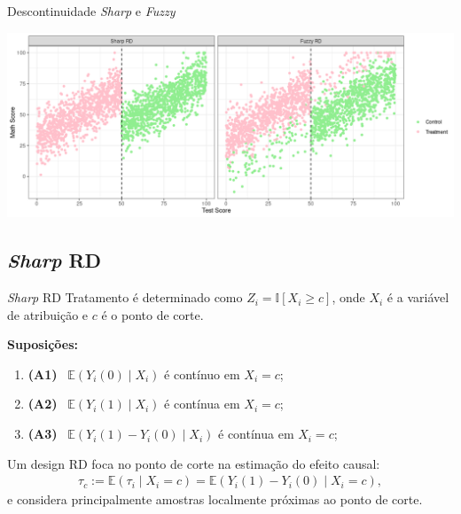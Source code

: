\documentclass[aspectratio=1610, 10pt]{beamer}
\begin{document}
\begin{frame}{Descontinuidade \emph{Sharp} e \emph{Fuzzy}}
    \begin{center}
        \includegraphics[width = \linewidth]{fig/FuzzySharpSimulation.png}
    \end{center}
\end{frame}


\subsection{\textit{Sharp} RD}

\begin{frame}{\textit{Sharp} RD}
    Tratamento é determinado como $Z_i = \mathbb{I}[X_i \geq c]$, onde $X_i$ é a variável de atribuição e $c$ é o ponto de corte.

    \vspace{0.3cm}
    \textbf{Suposições:}
    \begin{enumerate}
        \item[] \textbf{(A1)} \ $\mathbb{E}(Y_i(0) \mid X_i)$ é contínuo em $X_i = c$;
        \item[] \textbf{(A2)} \ $\mathbb{E}(Y_i(1) \mid X_i)$ é contínua em $X_i = c$;
        \item[] \textbf{(A3)} \ $\mathbb{E}(Y_i(1) - Y_i(0) \mid X_i)$ é contínua em $X_i = c$;
    \end{enumerate}

    \vspace{0.3cm}
    Um design RD foca no ponto de corte na estimação do efeito causal:
    \begin{align*}
        \tau_c := \mathbb{E}(\tau_i \mid X_i = c) = \mathbb{E}(Y_i(1) - Y_i(0) \mid X_i = c),
    \end{align*}
    e considera principalmente amostras localmente próximas ao ponto de corte.
\end{frame}
\end{document}
